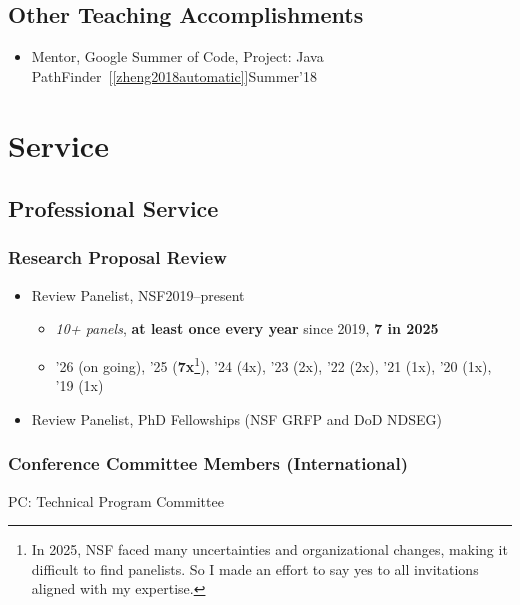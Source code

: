 \documentclass[11pt]{article}
\begin{document}
\subsection{Other Teaching Accomplishments}
\begin{itemize}
    \item Mentor, Google Summer of Code, Project: Java PathFinder~[\ref{zheng2018automatic}]\hfill Summer'18
\end{itemize}

\section{Service}
\subsection{Professional Service}

\subsubsection{Research Proposal Review}
\begin{itemize}
    \item Review Panelist, NSF\hfill 2019--present
    \begin{itemize}
        \item \emph{10+ panels}, \textbf{at least once every year} since 2019, \textbf{7 in 2025}
        \item '26 (on going), '25 (\textbf{7x}\footnote{In 2025, NSF faced many uncertainties and organizational changes, making it difficult to find panelists. So I made an effort to say yes to all invitations aligned with my expertise.}), '24 (4x), '23 (2x), '22 (2x), '21 (1x), '20 (1x), '19 (1x)
    \end{itemize}
  \item Review Panelist, PhD Fellowships (NSF GRFP and DoD NDSEG)
\end{itemize}

\subsubsection{Conference Committee Members (International)}

\begin{description}[before=\small]
    \item PC: Technical Program Committee
\end{description}
\end{document}
